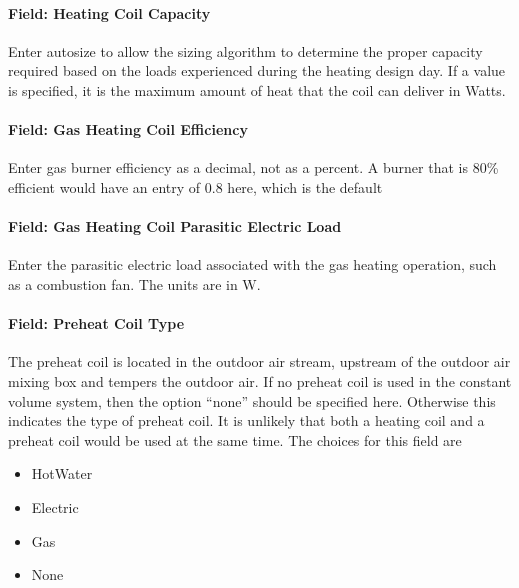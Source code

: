 \paragraph{Field: Heating Coil Capacity}\label{field-heating-coil-capacity-3}

Enter autosize to allow the sizing algorithm to determine the proper capacity required based on the loads experienced during the heating design day. If a value is specified, it is the maximum amount of heat that the coil can deliver in Watts.

\paragraph{Field: Gas Heating Coil Efficiency}\label{field-gas-heating-coil-efficiency-5}

Enter gas burner efficiency as a decimal, not as a percent. A burner that is 80\% efficient would have an entry of 0.8 here, which is the default

\paragraph{Field: Gas Heating Coil Parasitic Electric Load}\label{field-gas-heating-coil-parasitic-electric-load-5}

Enter the parasitic electric load associated with the gas heating operation, such as a combustion fan. The units are in W.

\paragraph{Field: Preheat Coil Type}\label{field-preheat-coil-type-1}

The preheat coil is located in the outdoor air stream, upstream of the outdoor air mixing box and tempers the outdoor air. If no preheat coil is used in the constant volume system, then the option ``none'' should be specified here. Otherwise this indicates the type of preheat coil. It is unlikely that both a heating coil and a preheat coil would be used at the same time. The choices for this field are

\begin{itemize}
\item
  HotWater
\item
  Electric
\item
  Gas
\item
  None
\end{itemize}

